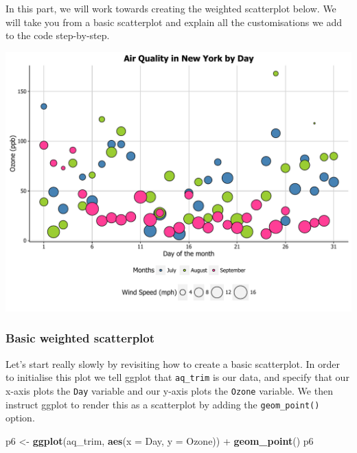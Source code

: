 \documentclass[]{article}
\newenvironment{Shaded}{\begin{snugshade}}{\end{snugshade}}
\newcommand{\KeywordTok}[1]{\textcolor[rgb]{0.13,0.29,0.53}{\textbf{{#1}}}}
\newcommand{\DataTypeTok}[1]{\textcolor[rgb]{0.13,0.29,0.53}{{#1}}}
\newcommand{\StringTok}[1]{\textcolor[rgb]{0.31,0.60,0.02}{{#1}}}
\newcommand{\NormalTok}[1]{{#1}}
\begin{document}
In this part, we will work towards creating the weighted scatterplot
below. We will take you from a basic scatterplot and explain all the
customisations we add to the code step-by-step.

\begin{center}\includegraphics{0_all_posts_pdf/wscatter_finalgraph-1} \end{center}

\subsubsection{Basic weighted
scatterplot}\label{basic-weighted-scatterplot}

Let's start really slowly by revisiting how to create a basic
scatterplot. In order to initialise this plot we tell ggplot that
\texttt{aq\_trim} is our data, and specify that our x-axis plots the
\texttt{Day} variable and our y-axis plots the \texttt{Ozone} variable.
We then instruct ggplot to render this as a scatterplot by adding the
\texttt{geom\_point()} option.

\begin{Shaded}
\begin{Highlighting}[]
\NormalTok{p6 <-}\StringTok{ }\KeywordTok{ggplot}\NormalTok{(aq_trim, }\KeywordTok{aes}\NormalTok{(}\DataTypeTok{x =} \NormalTok{Day, }\DataTypeTok{y =} \NormalTok{Ozone)) +}\StringTok{ }
\StringTok{      }\KeywordTok{geom_point}\NormalTok{()}
\NormalTok{p6}
\end{Highlighting}
\end{Shaded}
\end{document}
